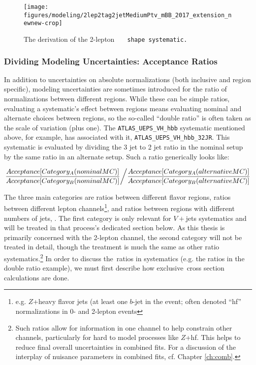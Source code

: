 \begin{figure}[!htbp]\captionsetup{justification=centering}
  \centering
  \centering\texttt{[image: figures/modeling/2lep2tag2jetMediumPtv\_mBB\_2017\_extension\_newnew-crop]}
  \caption{The derivation of the 2-lepton \tt\,\mbb\, shape systematic.}
  \label{fig:ttbarmbbl2eg}
\end{figure}

\subsubsection{Dividing Modeling Uncertainties: Acceptance Ratios}
In addition to uncertainties on absolute normalizations (both inclusive and region specific), modeling uncertainties are sometimes introduced for the ratio of normalizations between different regions.  While these can be simple ratios, evaluating a systematic's effect between regions means evaluating nominal and alternate choices between regions, so the so-called ``double ratio'' is often taken as the scale of variation (plus one).  The \texttt{ATLAS\_UEPS\_VH\_hbb} systematic mentioned above, for example, has associated with it, \texttt{ATLAS\_UEPS\_VH\_hbb\_32JR}.  This systematic is evaluated by dividing the 3 jet to 2 jet ratio in the nominal setup by the same ratio in an alternate setup.  Such a ratio generically looks like:

\begin{equation}
\label{eqn:doubleratio}
\left. \dfrac{Acceptance[Category_{A}(nominal MC)]}{Acceptance[Category_{B}(nominal MC)]} \middle/ \dfrac{Acceptance[Category_{A}(alternative MC)]}{Acceptance[Category_{B}(alternative MC)]} \right.
\end{equation}

  The three main categories are ratios between different flavor regions, ratios between different lepton channels\footnote{e.g. $Z$+heavy flavor jets (at least one $b$-jet in the event; often denoted ``hf'' normalizations in 0- and 2-lepton events}, and ratios between regions with different numbers of jets, \nj.  The first category is only relevant for $V+$jets systematics and will be treated in that process's dedicated section below.  As this thesis is primarily concerned with the 2-lepton channel, the second category will not be treated in detail, though the treatment is much the same as other ratio systematics.\footnote{Such ratios allow for information in one channel to help constrain other channels, particularly for hard to model processes like $Z$+hf.  This helps to reduce final overall uncertainties in combined fits.  For a discussion of the interplay of nuisance parameters in combined fits, cf. Chapter \ref{ch:comb}.}  In order to discuss the \nj\,ratios in systematics (e.g. the ratios in the double ratio example), we must first describe how exclusive \nj\,cross section calculations are done.

